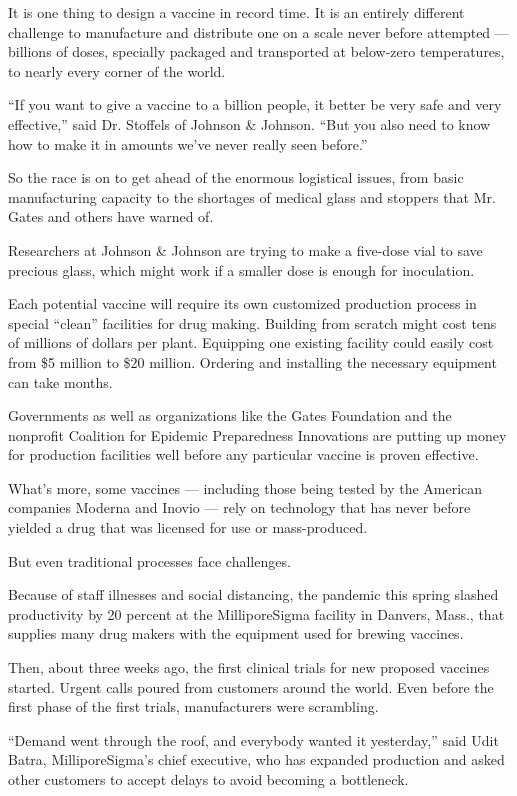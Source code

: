 It is one thing to design a vaccine in record time. It is an entirely
different challenge to manufacture and distribute one on a scale never
before attempted --- billions of doses, specially packaged and
transported at below-zero temperatures, to nearly every corner of the
world.

``If you want to give a vaccine to a billion people, it better be very
safe and very effective,'' said Dr. Stoffels of Johnson \& Johnson.
``But you also need to know how to make it in amounts we've never really
seen before.''

So the race is on to get ahead of the enormous logistical issues, from
basic manufacturing capacity to the shortages of medical glass and
stoppers that Mr. Gates and others have warned of.

Researchers at Johnson \& Johnson are trying to make a five-dose vial to
save precious glass, which might work if a smaller dose is enough for
inoculation.

Each potential vaccine will require its own customized production
process in special ``clean'' facilities for drug making. Building from
scratch might cost tens of millions of dollars per plant. Equipping one
existing facility could easily cost from \$5 million to \$20 million.
Ordering and installing the necessary equipment can take months.

Governments as well as organizations like the Gates Foundation and the
nonprofit Coalition for Epidemic Preparedness Innovations are putting up
money for production facilities well before any particular vaccine is
proven effective.

What's more, some vaccines --- including those being tested by the
American companies Moderna and Inovio --- rely on technology that has
never before yielded a drug that was licensed for use or mass-produced.

But even traditional processes face challenges.

Because of staff illnesses and social distancing, the pandemic this
spring slashed productivity by 20 percent at the MilliporeSigma facility
in Danvers, Mass., that supplies many drug makers with the equipment
used for brewing vaccines.

Then, about three weeks ago, the first clinical trials for new proposed
vaccines started. Urgent calls poured from customers around the world.
Even before the first phase of the first trials, manufacturers were
scrambling.

``Demand went through the roof, and everybody wanted it yesterday,''
said Udit Batra, MilliporeSigma's chief executive, who has expanded
production and asked other customers to accept delays to avoid becoming
a bottleneck.


